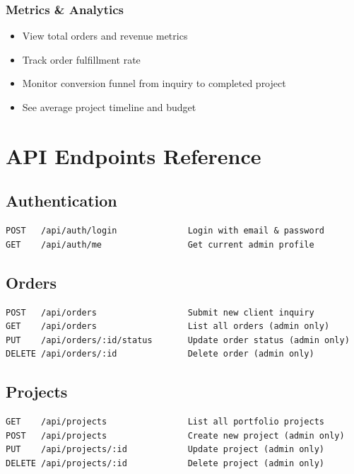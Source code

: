 \documentclass[12pt]{article}
\begin{document}
\subsubsection{Metrics \& Analytics}
\begin{itemize}
  \item View total orders and revenue metrics
  \item Track order fulfillment rate
  \item Monitor conversion funnel from inquiry to completed project
  \item See average project timeline and budget
\end{itemize}

\section{API Endpoints Reference}

\subsection{Authentication}

\begin{lstlisting}
POST   /api/auth/login              Login with email & password
GET    /api/auth/me                 Get current admin profile
\end{lstlisting}

\subsection{Orders}

\begin{lstlisting}
POST   /api/orders                  Submit new client inquiry
GET    /api/orders                  List all orders (admin only)
PUT    /api/orders/:id/status       Update order status (admin only)
DELETE /api/orders/:id              Delete order (admin only)
\end{lstlisting}

\subsection{Projects}

\begin{lstlisting}
GET    /api/projects                List all portfolio projects
POST   /api/projects                Create new project (admin only)
PUT    /api/projects/:id            Update project (admin only)
DELETE /api/projects/:id            Delete project (admin only)
\end{lstlisting}
\end{document}
